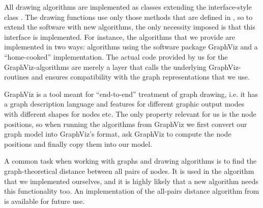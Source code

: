 All drawing algorithms are implemented as classes extending the
interface-style class . The drawing functions use
only those methods that are defined in , so to extend
the software with new algorithms, the only necessity imposed is that this
interface is implemented. For instance, the algorithms that we provide are
implemented in two ways: algorithms using the software package GraphViz
\cite{GraphViz} and a ``home-cooked'' implementation. The actual code provided
by us for the GraphViz-algorithms are merely a layer that calls the underlying
GraphViz-routines and ensures compatibility with the graph representations
that we use.

GraphViz is a tool meant for ``end-to-end'' treatment of graph drawing, i.e.
it has a graph description language and features for different graphic output
modes with different shapes for nodes etc. The only property relevant for us
is the node positions, so when running the algorithms from GraphViz we first
convert our graph model into GraphViz's format, ask GraphViz to compute the
node positions and finally copy them into our model. 

A common task when working with graphs and drawing algorithms is to find the
graph-theoretical distance between all pairs of nodes. It is used in the
algorithm that we implemented ourselves, and it is highly likely that a new
algorithm needs this functionality too. An implementation of the all-pairs
distance algorithm from \cite{Seidel1992} is available for future use.

